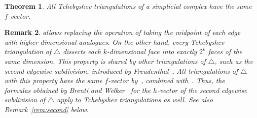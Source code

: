 \documentclass[reqno,12pt]{amsart}
\numberwithin{equation}{section}
\newtheorem{theorem}{Theorem}[section]
\newtheorem{remark}[theorem]{Remark}
\newcommand{\0}{\widehat{0}}
\newcommand{\1}{\widehat{1}}
\newcommand{\2}{\widehat{2}}
\begin{document}
\begin{theorem}
\label{thm:Hetyei-Nevo}  
All Tchebyshev triangulations of a simplicial complex have the same $f$-vector.
\end{theorem}
\begin{remark}
{\em   
\cite[Theorem 3.3]{Hetyei-Nevo} allows replacing the operation of
taking the midpoint of each edge with higher dimensional analogues. On
the other hand, every Tchebyshev triangulation of $\triangle$ dissects
each $k$-dimensional face into exactly $2^k$ faces of the same dimension. This
property is shared by other triangulations of $\triangle$, such as the second
edgewise subdivision, introduced by Freudenthal~\cite{Freudenthal}. All
triangulations of $\triangle$ with this property have the same
$f$-vector by~\cite[Example 2.8]{Athanasiadis-survey}, 
combined with~\cite[Theorem 3.2]{Stanley-subdivisions}. Thus, the
formulas obtained by Brenti 
and Welker~\cite{Brenti-Welker} for the $h$-vector of the second
edgewise subdivision of $\triangle$ 
apply to Tchebyshev triangulations as well. See also
Remark~\ref{rem:second} below.  
} 
\end{remark}  
\end{document}
